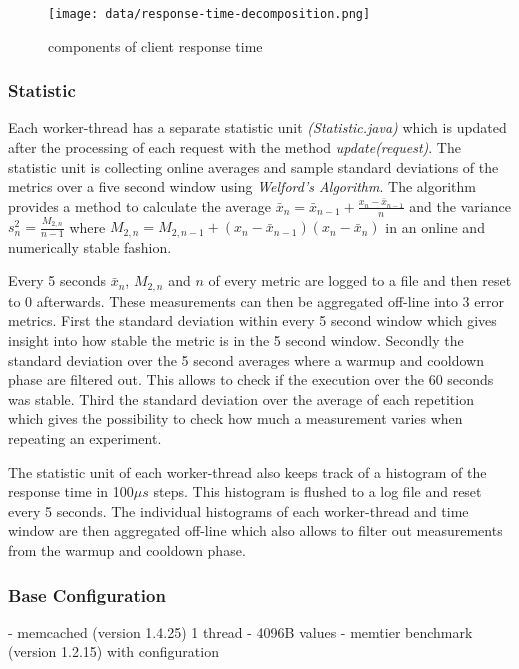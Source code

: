 \documentclass[report.tex]{subfiles}
\begin{document}
\begin{figure}
	\centering
	\texttt{[image: data/response-time-decomposition.png]}
	\caption{components of client response time}\label{rt_decomposition}
\end{figure}

\subsubsection{Statistic}

Each worker-thread has a separate statistic unit \emph{(Statistic.java)} which is updated after the processing of each request with the method \emph{update(request)}.  
The statistic unit is collecting online averages and sample standard deviations of the metrics over a five second window using \emph{Welford's Algorithm}.\cite{Knuth:1997:ACP:270146} 
The algorithm provides a method to calculate the average $\bar{x}_n = \bar{x}_{n-1} + \frac{x_n -\bar{x}_{n-1}}{n}$ and the variance $s^2_n = \frac{M_{2,n}}{n-1}$ where $M_{2,n} = M_{2,n-1} + (x_n - \bar{x}_{n-1})(x_n - \bar{x}_n)$ in an online and numerically stable fashion.

Every 5 seconds $\bar{x}_n$, $M_{2,n}$ and $n$ of every metric are logged to a file and then reset to 0 afterwards. These measurements can then be aggregated off-line into 3 error metrics. First the standard deviation within every 5 second window which gives insight into how stable the metric is in the 5 second window. Secondly the standard deviation over the 5 second averages where a warmup and cooldown phase are filtered out. This allows to check if the execution over the 60 seconds was stable. Third the standard deviation over the average of each repetition which gives the possibility to check how much a measurement varies when repeating an experiment.

The statistic unit of each worker-thread also keeps track of a histogram of the response time in 100$\mu s$ steps. This histogram is flushed to a log file and reset every 5 seconds. The individual histograms of each worker-thread and time window are then aggregated off-line which also allows to filter out measurements from the warmup and cooldown phase.


\subsubsection{Base Configuration}
- memcached (version 1.4.25) 1 thread
- 4096B values
- memtier benchmark (version 1.2.15) with configuration
\end{document}
